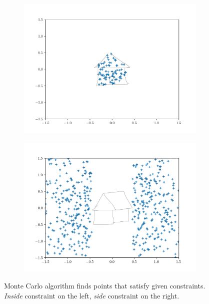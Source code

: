 \begin{figure}[ht]
    \centering
    \begin{subfigure}{0.45\textwidth}
        \centering
        \includegraphics[width=\textwidth]{figures/rule_in_house.pdf}
    \end{subfigure}
    \begin{subfigure}{0.45\textwidth}
        \centering
        \includegraphics[width=\textwidth]{figures/rule_disjunct_side_house.png}
    \end{subfigure}
    \caption[Monte Carlo algorithm with rule-based constraints]{Monte Carlo algorithm finds points that satisfy given constraints. \emph{Inside} constraint on the left, \emph{side} constraint on the right.}
    \label{fig:monte_carlo:1}
\end{figure}

